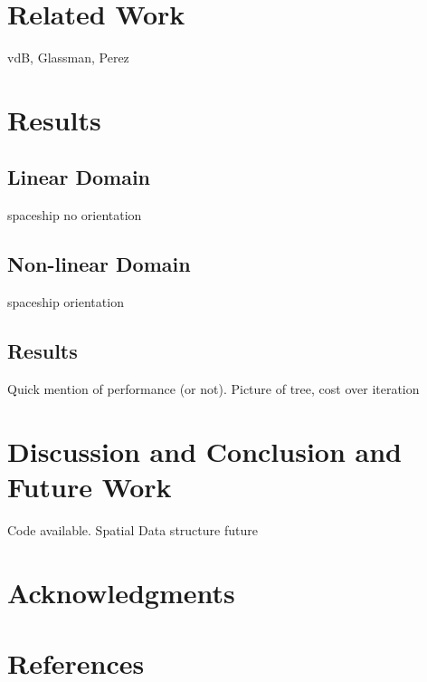 \documentclass[letterpaper, 10pt, english, conference]{IEEEtran}
\begin{document}
\section{Related Work}

vdB, Glassman, Perez


\section{Results}


\subsection{Linear Domain}

spaceship no orientation


\subsection{Non-linear Domain}

spaceship orientation


\subsection{Results}

Quick mention of performance (or not). Picture of tree, cost over
iteration


\section{Discussion and Conclusion and Future Work}

Code available. Spatial Data structure future


\section{Acknowledgments}


\section{References}


\end{document}
